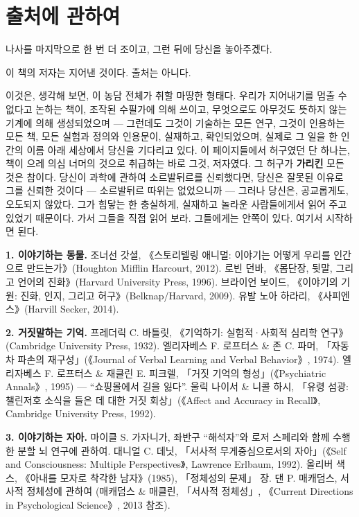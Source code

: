 \chapter*{출처에 관하여}
{}
\label{sec:noteonsources}

나사를 마지막으로 한 번 더 조이고, 그런 뒤에 당신을 놓아주겠다.

이 책의 저자는 지어낸 것이다. 출처는 아니다.

이것은, 생각해 보면, 이 농담 전체가 취할 마땅한 형태다. 우리가 지어내기를 멈출 수 없다고 논하는 책이, 조작된 수필가에 의해 쓰이고, 무엇으로도 아무것도 뜻하지 않는 기계에 의해 생성되었으며 — 그런데도 그것이 기술하는 모든 연구, 그것이 인용하는 모든 책, 모든 실험과 정의와 인용문이, 실재하고, 확인되었으며, 실제로 그 일을 한 인간의 이름 아래 세상에서 당신을 기다리고 있다. 이 페이지들에서 허구였던 단 하나는, 책이 으레 의심 너머의 것으로 취급하는 바로 그것, 저자였다. 그 허구가 \textbf{가리킨} 모든 것은 참이다. 당신이 과학에 관하여 소르발뒤르를 신뢰했다면, 당신은 잘못된 이유로 그를 신뢰한 것이다 — 소르발뒤르 따위는 없었으니까 — 그러나 당신은, 공교롭게도, 오도되지 않았다. 그가 힘닿는 한 충실하게, 실재하고 놀라운 사람들에게서 읽어 주고 있었기 때문이다. 가서 그들을 직접 읽어 보라. 그들에게는 안쪽이 있다. 여기서 시작하면 된다.

\textbf{1. 이야기하는 동물.} 조너선 갓셜, 《스토리텔링 애니멀: 이야기는 어떻게 우리를 인간으로 만드는가》(Houghton Mifflin Harcourt, 2012). 로빈 던바, 《몸단장, 뒷말, 그리고 언어의 진화》(Harvard University Press, 1996). 브라이언 보이드, 《이야기의 기원: 진화, 인지, 그리고 허구》(Belknap/Harvard, 2009). 유발 노아 하라리, 《사피엔스》(Harvill Secker, 2014).

\textbf{2. 거짓말하는 기억.} 프레더릭 C. 바틀릿, 《기억하기: 실험적·사회적 심리학 연구》(Cambridge University Press, 1932). 엘리자베스 F. 로프터스 \& 존 C. 파머, 「자동차 파손의 재구성」(《Journal of Verbal Learning and Verbal Behavior》, 1974). 엘리자베스 F. 로프터스 \& 재클린 E. 피크렐, 「거짓 기억의 형성」(《Psychiatric Annals》, 1995) — ``쇼핑몰에서 길을 잃다''. 울릭 나이서 \& 니콜 하시, 「유령 섬광: 챌린저호 소식을 들은 데 대한 거짓 회상」(《Affect and Accuracy in Recall》, Cambridge University Press, 1992).

\textbf{3. 이야기하는 자아.} 마이클 S. 가자니가, 좌반구 ``해석자''와 로저 스페리와 함께 수행한 분할 뇌 연구에 관하여. 대니얼 C. 데닛, 「서사적 무게중심으로서의 자아」(《Self and Consciousness: Multiple Perspectives》, Lawrence Erlbaum, 1992). 올리버 색스, 《아내를 모자로 착각한 남자》(1985), 「정체성의 문제」 장. 댄 P. 매캐덤스, 서사적 정체성에 관하여 (매캐덤스 \& 매클린, 「서사적 정체성」, 《Current Directions in Psychological Science》, 2013 참조).

